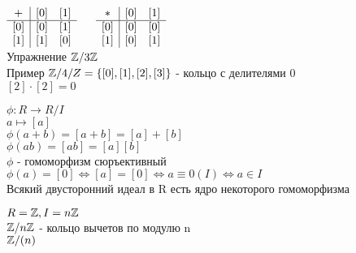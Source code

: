 $\begin{array}{c|cc}
	+ & [0] & [1] \\
	\hline
	[0] & [0] & [1] \\ \relax
	[1] & [1] & [0] 
\end{array} \ \ \ \ \ 
\begin{array}{c|cc}
* & [0] & [1] \\
\hline
[0] & [0] & [0] \\ \relax
[1] & [0] & [1] 
\end{array}  $\\
Упражнение $ \mathbb{Z} / 3\mathbb{Z} $ \\
Пример $ \mathbb{Z} / 4/Z = \{ [0], [1], [2], [3] \} $ - кольцо с делителями 0 \\
$ [2] \cdot [2] = 0 $ 

$ \phi : R \rightarrow R / I $ \\
$ a \mapsto [a] $ \\
$ \phi(a + b) = [a+b] = [a] + [b] $\\
$ \phi(ab) = [ab] = [a][b] $\\
$ \phi $ - гомоморфизм сюръективный \\
$ \phi(a) = [0]  \Leftrightarrow [a] = [0] \Leftrightarrow a \equiv 0(I) \Leftrightarrow a \in I $\\
Всякий двусторонний идеал в R есть ядро некоторого гомоморфизма \\
\begin{definition}
	$ R = \mathbb{Z}, I = n\mathbb{Z} $ \\
	$ \mathbb{Z} / n\mathbb{Z} $ - кольцо вычетов по модулю n\\
	$ \mathbb{Z} / (n) $
\end{definition}


